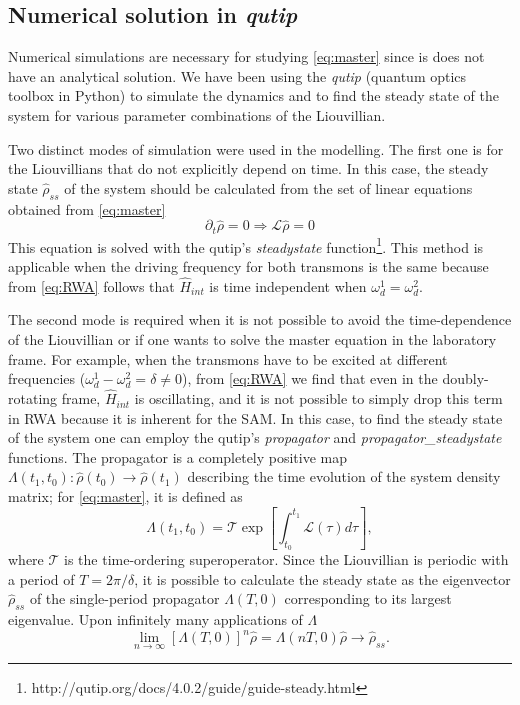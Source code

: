 \documentclass[%
 pra,
 amsmath,amssymb,
 reprint,%
]{revtex4-1}
\begin{document}
\subsection{Numerical solution in \textit{qutip}}


Numerical simulations are necessary for studying 
\autoref{eq:master} since is does not have an 
analytical solution. We have been using the 
\textit{qutip}\cite{johansson2013qutip} (quantum 
optics toolbox in Python) to simulate the 
dynamics and to find the steady state of the 
system for various parameter combinations of the 
Liouvillian.

Two distinct modes of simulation were used in the 
modelling. The first one is for the Liouvillians 
that do not explicitly depend on time. In this 
case, the steady state $\hat \rho_{ss}$ of the 
system should be calculated from the set of 
linear equations obtained from \autoref{eq:master}
\begin{equation}
\partial_t \hat \rho = 0  \Rightarrow \mathcal{L} 
\hat \rho = 0
\label{eq:steady}
\end{equation}
This equation is solved with the qutip's 
\textit{steadystate} 
function\footnote{http://qutip.org/docs/4.0.2/guide/guide-steady.html}.
 This method is applicable when the driving 
frequency for both transmons is the same because 
from \autoref{eq:RWA} follows that $\hat H_{int}$ 
is time independent when $\omega_d^1 = 
\omega_d^2$.

The second mode is required when it is not 
possible to avoid the time-dependence of the 
Liouvillian or if one wants to solve the master 
equation in the laboratory frame. For example, 
when the transmons have to be excited at 
different frequencies ($\omega_d^1 - \omega_d^2 = 
\delta \neq 0$), from \autoref{eq:RWA} we find 
that even in the doubly-rotating frame, $\hat 
H_{int}$ is oscillating, and it is not possible 
to simply drop this term in RWA because it is 
inherent for the SAM. In this case, to find the 
steady state of the system one can employ the 
qutip's \textit{propagator} and 
\textit{propagator\_steadystate} functions. The 
propagator is a completely positive map 
$\Lambda(t_1, t_0): \hat \rho(t_0) \rightarrow 
\hat \rho(t_1)$ describing the time evolution of 
the system density matrix; for 
\autoref{eq:master}, it is defined as
\begin{equation}
\Lambda(t_1, t_0) = \mathcal{T} \exp [\int_{t_0}^{t_1} \mathcal L(\tau) d\tau],
\label{eq:propagator}
\end{equation}
where $\mathcal T$ is the time-ordering 
superoperator. Since the Liouvillian is periodic 
with a period of $T = 2\pi/\delta$, it is 
possible to calculate the steady state as the 
eigenvector $\hat \rho_{ss}$ of the single-period 
propagator $\Lambda(T, 0)$ corresponding to its 
largest eigenvalue\cite{dittrich1998quantum, 
rivas2012open}. Upon infinitely many applications 
of $\Lambda$
\[
\lim_{n\to \infty} \left[\Lambda(T, 0)\right]^n \hat \rho = \Lambda(nT, 0) \hat \rho \to \hat \rho_{ss}.
\]
\end{document}

